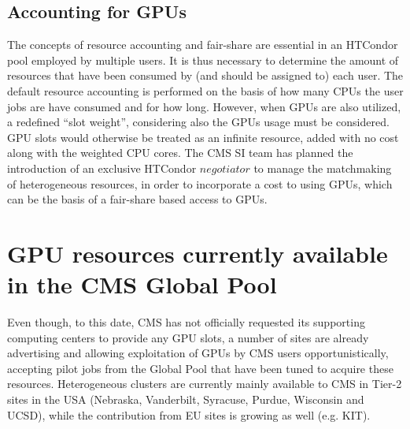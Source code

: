 \documentclass{webofc}
\begin{document}

\subsection{Accounting for GPUs}
The concepts of resource accounting and fair-share are essential in an HTCondor pool employed by multiple users. It is thus necessary to determine the amount of resources that have been consumed by  (and should be assigned to) each user. The default resource accounting is performed on the basis of how many CPUs the user jobs are have consumed and for how long. However, when GPUs are also utilized, a redefined ``slot weight'', considering also the GPUs usage must be considered. GPU slots would otherwise be treated as an infinite resource, added with no cost along with the weighted CPU cores. The CMS SI team has planned the introduction of an exclusive HTCondor $negotiator$ to manage the matchmaking of heterogeneous resources, in order to incorporate a cost to using GPUs, which can be the basis of a fair-share based access to GPUs.


\section{GPU resources currently available in the CMS Global Pool}
\label{sec:status}
Even though, to this date, CMS has not officially requested its supporting computing centers to provide any GPU slots, a number of sites are already advertising and allowing exploitation of GPUs by CMS users opportunistically, accepting pilot jobs from the Global Pool that have been tuned to acquire these resources. Heterogeneous clusters are currently mainly available to CMS in Tier-2 sites in the USA (Nebraska, Vanderbilt, Syracuse, Purdue, Wisconsin and UCSD), while the contribution from EU sites is growing as well (e.g. KIT). 
\end{document}
